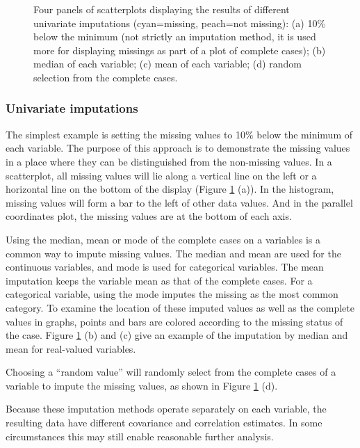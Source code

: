 \documentclass[article]{jss}
\begin{document}
\begin{center}
\begin{figure}[h]
\caption{\label{fig:univariate-imputation}Four panels of scatterplots displaying the results of different univariate imputations (cyan=missing, peach=not missing): (a) 10\% below the minimum (not strictly an imputation method, it is used more for displaying missings as part of a plot of complete cases); (b) median of each variable; (c) mean of each variable; (d) random selection from the complete cases. }

\end{figure}
\par\end{center}

\subsubsection{Univariate imputations}

The simplest example is setting the missing values to 10\% below the minimum of each variable. The purpose of this approach is to demonstrate the missing values in a place where they can be distinguished from the non-missing values. In a scatterplot, all missing values will lie along a vertical line on the left or a horizontal line on the bottom of the display (Figure \ref{fig:univariate-imputation} (a)). In the histogram, missing values will form a bar to the left of other data values. And in the parallel coordinates plot, the missing values are at the bottom of each axis.

Using the median, mean or mode of the complete cases on a variables is a common way to impute missing values. The median and mean are used for the continuous variables, and mode is used for categorical variables. The mean imputation keeps the variable mean as that of the complete cases. For a categorical variable, using the mode imputes the missing as the most common category. To examine the location of these imputed values as well as the complete values in graphs, points and bars are colored according to the missing status of the case. Figure \ref{fig:univariate-imputation} (b) and (c) give an example of the imputation by median and mean for real-valued variables.

Choosing a ``random value''  will randomly select from the complete cases of a variable to impute the missing values, as shown in Figure \ref{fig:univariate-imputation} (d).

Because these imputation methods operate separately on each variable, the resulting data have different covariance and correlation estimates. In some circumstances this may still enable reasonable further analysis.
\end{document}
